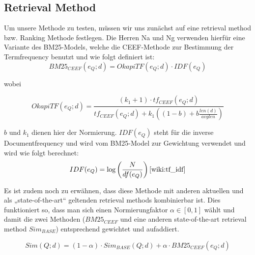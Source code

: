 \subsection{Retrieval Method}

Um unsere Methode zu testen, müssen wir uns zunächst auf eine retrieval method bzw. Ranking Methode festlegen. Die Herren Na und Ng verwenden hierfür eine Variante des BM25-Models, welche die CEEF-Methode zur Bestimmung der Termfrequency benutzt und wie folgt definiert ist:
\[ BM25_{CEEF}(e_Q;d) = OkapiTF(e_Q;d) \cdot IDF(e_Q) \]

wobei

\[ OkapiTF(e_Q;d) = \frac{ (k_1 + 1) \cdot tf_{CEEF}(e_Q;d)}{tf_{CEEF}(e_Q;d) + k_1\left( (1-b) + b \frac{len(d)}{avglen} \right)} \]

$b$ und $k_1$ dienen hier der Normierung. $IDF(e_Q)$ steht für die inverse Documentfrequency und wird vom BM25-Model zur Gewichtung verwendet und wird wie folgt berechnet:
\[ IDF(e_Q) = \log \left( \frac{N}{df(e_Q)} \right) \text{\cite{wiki:tf_idf}} \]

Es ist zudem noch zu erwähnen, dass diese Methode mit anderen aktuellen und als „state-of-the-art“ geltenden retrieval methods kombinierbar ist. Dies funktioniert so, dass man sich einen Normierungfaktor $\alpha \in [0,1]$ wählt und damit die zwei Methoden ($BM25_{CEEF}$ und eine anderen state-of-the-art retrieval method $Sim_{BASE}$) entsprechend gewichtet und aufaddiert.

\[ Sim(Q;d) = (1-\alpha) \cdot Sim_{BASE}(Q;d) + \alpha \cdot BM25_{CEEF}(e_Q;d) \]
